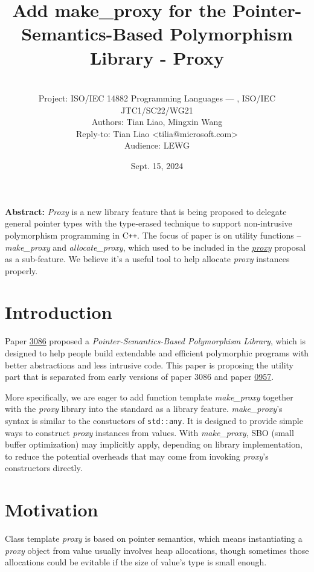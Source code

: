 \documentclass[10pt, a4paper, oneside]{article}
\title{Add make\_proxy for the Pointer-Semantics-Based
Polymorphism Library - Proxy}
\date{Sept. 15, 2024}
\author{%
\ \\
Project: ISO/IEC 14882 Programming Languages — \Cpp, ISO/IEC JTC1/SC22/WG21\\
Authors: Tian Liao, Mingxin Wang\\
Reply-to: Tian Liao \textless tilia@microsoft.com\textgreater \\
Audience: LEWG\\
}
\makeatletter
\newcommand{\Cpp}{C\texttt{++}}
\renewcommand{\maketitle}{\bgroup\setlength{\parindent}{0pt}
\begin{flushleft}
  \textbf{\huge \@title}

  \@author
\end{flushleft}\egroup
}
\makeatother
\begin{document}
\maketitle

\textbf{Abstract:} \textit{Proxy} is a new library feature that is being proposed to delegate general pointer types
with the type-erased technique to support non-intrusive polymorphism programming in \Cpp.
The focus of paper is on utility functions -- \textit{make\_proxy} and \textit{allocate\_proxy},
which used to be included in the \href{https://wg21.link/p3086r1}{\textit{proxy}} proposal as a sub-feature.
We believe it's a useful tool to help allocate \textit{proxy} instances properly.

\section{Introduction}

Paper \href{https://wg21.link/p3086}{3086} proposed a \textit{Pointer-Semantics-Based Polymorphism Library},
which is designed to help people build extendable and efficient polymorphic programs with better abstractions and less intrusive code.
This paper is proposing the utility part that is separated from early versions of paper 3086 and paper \href{https://wg21.link/p0957}{0957}.

More specifically, we are eager to add function template \textit{make\_proxy} together with the \textit{proxy} library into the standard as a library feature.
\textit{make\_proxy}'s syntax is similar to the constuctors of \verb|std::any|. It is designed to provide simple ways to construct \textit{proxy} instances from values.
With \textit{make\_proxy}, SBO (small buffer optimization) may implicitly apply, depending on library implementation, to reduce the potential overheads that may come from invoking \textit{proxy}'s constructors directly.

\section{Motivation}
Class template \textit{proxy} is based on pointer semantics,
which means instantiating a \textit{proxy} object from value usually involves heap allocations,
though sometimes those allocations could be evitable if the size of value's type is small enough.
\end{document}
